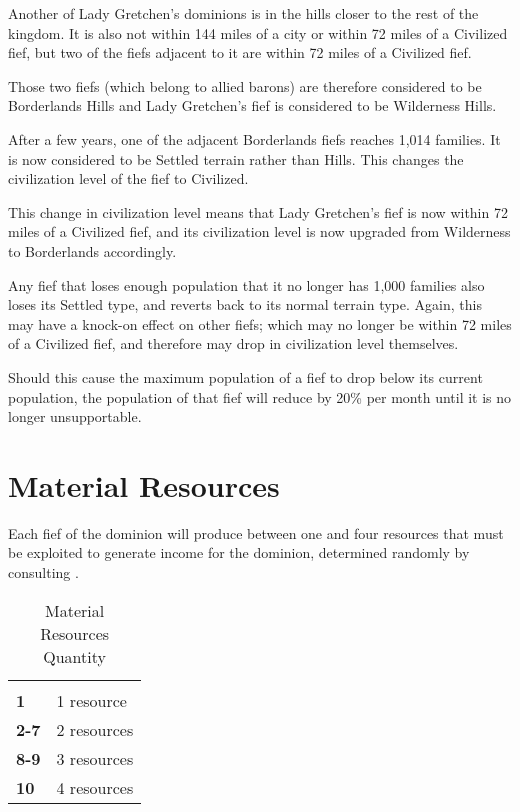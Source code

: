 \begin{multicols*}{2}
{Another of Lady Gretchen’s dominions is in the hills closer to the rest of the kingdom. It is also not within 144 miles of a city or within 72 miles of a Civilized fief, but two of the fiefs adjacent to it are within 72 miles of a Civilized fief.

Those two fiefs (which belong to allied barons) are therefore considered to be Borderlands Hills and Lady Gretchen’s fief is considered to be Wilderness Hills.

After a few years, one of the adjacent Borderlands fiefs reaches 1,014 families. It is now considered to be Settled terrain rather than Hills. This changes the civilization level of the fief to Civilized.

This change in civilization level means that Lady Gretchen’s fief is now within 72 miles of a Civilized fief, and its civilization level is now upgraded from Wilderness to Borderlands accordingly.}

Any fief that loses enough population that it no longer has 1,000 families also loses its Settled type, and reverts back to its normal terrain type. Again, this may have a knock-on effect on other fiefs; which may no longer be within 72 miles of a Civilized fief, and therefore may drop in civilization level themselves.

Should this cause the maximum population of a fief to drop below its current population, the population of that fief will reduce by 20\% per month until it is no longer unsupportable.

\section{Material Resources}
Each fief of the dominion will produce between one and four resources that must be exploited to generate income for the dominion, determined randomly by consulting .

\begin {table}[H]
  \caption{Material Resources Quantity}\label{tab:Material Resources Quantity}
  \begin{tabularx}{\columnwidth}{>{\bfseries}YY}
	 & \\
	1 & 1 resource\\
	2-7 & 2 resources\\
	8-9 & 3 resources\\
	10 & 4 resources
  \end {tabularx}
\end {table}


\end{multicols*}
